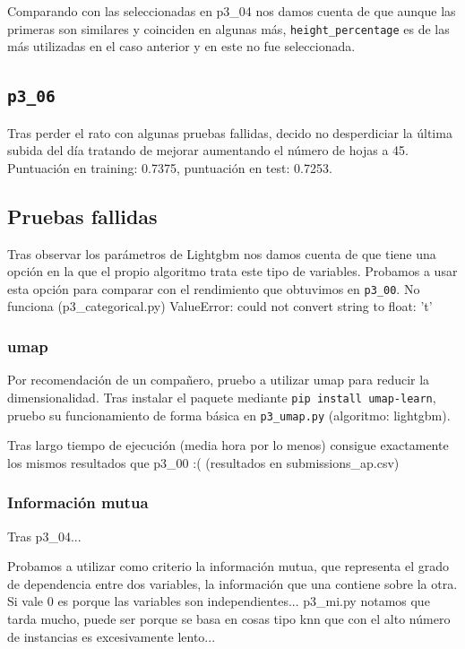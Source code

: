 \documentclass[a4paper, 20pt]{article}
\begin{document}
Comparando con las seleccionadas en p3\_04 nos damos cuenta de que aunque las primeras son similares y coinciden en algunas más, \texttt{height\_percentage} es de las más utilizadas en el caso anterior y en este no fue seleccionada.

\subsection{\texttt{p3\_06}}
Tras perder el rato con algunas pruebas fallidas, decido no desperdiciar la última subida del día tratando de mejorar aumentando el número de hojas a 45. Puntuación en training: 0.7375, puntuación en test: 0.7253.


\subsection{Pruebas fallidas}
Tras observar los parámetros de Lightgbm nos damos cuenta de que tiene una opción en la que el propio algoritmo trata este tipo de variables. Probamos a usar esta opción para comparar con el rendimiento que obtuvimos en \texttt{p3\_00}.
 No funciona (p3\_categorical.py)
 ValueError: could not convert string to float: 't'
\subsubsection{umap}
Por recomendación de un compañero, pruebo a utilizar umap para reducir la dimensionalidad. Tras instalar el paquete mediante \texttt{pip install umap-learn}, pruebo su funcionamiento de forma básica en \texttt{p3\_umap.py} (algoritmo: lightgbm).

Tras largo tiempo de ejecución (media hora por lo menos) consigue exactamente los mismos resultados que p3\_00 :( (resultados en submissions\_ap.csv)
\subsubsection{Información mutua}
Tras p3\_04...

Probamos a utilizar como criterio la información mutua, que representa el grado de dependencia entre dos variables, la información que una contiene sobre la otra. Si vale 0 es porque las variables son independientes... p3\_mi.py
notamos que tarda mucho, puede ser porque se basa en cosas tipo knn que con el alto número de instancias es excesivamente lento...
\end{document}
